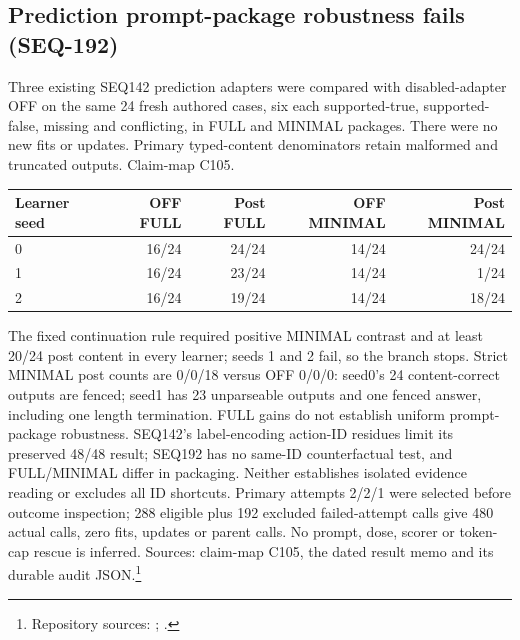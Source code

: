 \documentclass{article}
\begin{document}
\subsection{Prediction prompt-package robustness fails (SEQ-192)}
\label{sec:seq192}
Three existing SEQ142 prediction adapters were compared with disabled-adapter
OFF on the same 24 fresh authored cases, six each supported-true,
supported-false, missing and conflicting, in FULL and MINIMAL packages.
There were no new fits or updates. Primary typed-content denominators retain
malformed and truncated outputs. Claim-map C105.
\begin{center}
\begin{tabular}{lrrrr}
\toprule
Learner seed & OFF FULL & Post FULL & OFF MINIMAL & Post MINIMAL \\
\midrule
0 & 16/24 & 24/24 & 14/24 & 24/24 \\
1 & 16/24 & 23/24 & 14/24 & 1/24 \\
2 & 16/24 & 19/24 & 14/24 & 18/24 \\
\bottomrule
\end{tabular}
\end{center}
The fixed continuation rule required positive MINIMAL contrast and at least
20/24 post content in every learner; seeds 1 and 2 fail, so the branch stops.
Strict MINIMAL post counts are 0/0/18 versus OFF 0/0/0: seed0's 24
content-correct outputs are fenced; seed1 has 23 unparseable outputs and one
fenced answer, including one length termination. FULL gains do not establish
uniform prompt-package robustness. SEQ142's label-encoding action-ID residues
limit its preserved 48/48 result; SEQ192 has no same-ID counterfactual test,
and FULL/MINIMAL differ in packaging. Neither establishes isolated evidence
reading or excludes all ID shortcuts. Primary attempts 2/2/1 were selected
before outcome inspection; 288 eligible plus 192 excluded failed-attempt
calls give 480 actual calls, zero fits, updates or parent calls. No prompt,
dose, scorer or token-cap rescue is inferred. Sources: claim-map C105,
the dated result memo and its durable audit JSON.\footnote{Repository sources:
;
.}
\end{document}
